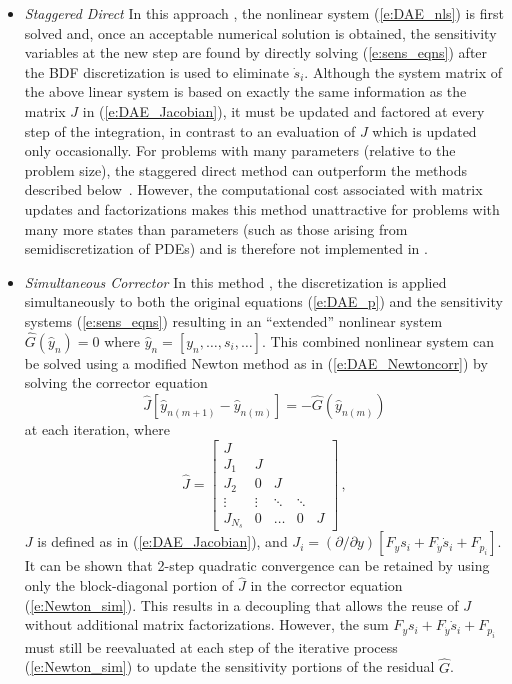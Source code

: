 \begin{itemize}

\item {\em Staggered Direct}
  In this approach \cite{CaSt:85}, the nonlinear system (\ref{e:DAE_nls}) is first
  solved and, once an acceptable numerical solution is obtained, the sensitivity
  variables at the new step are found by directly solving (\ref{e:sens_eqns})
  after the BDF discretization is used to eliminate ${\dot s}_i$.
  Although the system matrix of the above linear system is based on exactly the same
  information as the matrix $J$ in (\ref{e:DAE_Jacobian}), it must be updated and
  factored at every step of the integration, in contrast to an evaluation of
  $J$ which is updated only occasionally.  For problems with many parameters
  (relative to the problem size), the staggered direct method can outperform
  the methods described  below~\cite{LPZ:99}.
  However, the computational cost associated with matrix updates and factorizations
  makes this method unattractive for problems with many more states than parameters
  (such as those arising from semidiscretization of PDEs) and is therefore not
  implemented in {\idas}.

\item {\em Simultaneous Corrector}
  In this method \cite{MaPe:97}, the discretization is applied simultaneously
  to both the original equations (\ref{e:DAE_p}) and the sensitivity systems
  (\ref{e:sens_eqns}) resulting in an ``extended'' nonlinear system ${\hat G}({\hat y}_n) = 0$
  where ${\hat y_n} = [ y_n, \ldots, s_i, \ldots ]$.
  This combined nonlinear system can be solved using a modified Newton method as in
  (\ref{e:DAE_Newtoncorr}) by solving the corrector equation
  \begin{equation}\label{e:Newton_sim}
    {\hat J}[{\hat y}_{n(m+1)}-{\hat y}_{n(m)}]=-{\hat G}({\hat y}_{n(m)})
  \end{equation}
  at each iteration, where
  \begin{equation*}
    {\hat J} =
    \begin{bmatrix}
      J       &        &        &        &   \\
      J_1     & J      &        &        &   \\
      J_2     & 0      & J      &        &   \\
      \vdots  & \vdots & \ddots & \ddots &   \\
      J_{N_s} & 0      & \ldots & 0      & J
    \end{bmatrix} \, ,
  \end{equation*}
  $J$ is defined as in (\ref{e:DAE_Jacobian}), and
  $J_i = ({\partial}/{\partial y})\left[ F_y s_i + F_{\dot y} {\dot s_i} + F_{p_i} \right]$.
  It can be shown that 2-step quadratic convergence can be retained by using
  only the block-diagonal portion of ${\hat J}$ in the corrector equation
  (\ref{e:Newton_sim}). This results in a decoupling that allows the reuse of
  $J$ without additional matrix factorizations. However, the sum
  $F_y s_i + F_{\dot y} {\dot s_i} + F_{p_i}$ must still be reevaluated at
  each step of the iterative process (\ref{e:Newton_sim}) to update the
  sensitivity portions of the residual ${\hat G}$.


\end{itemize}
